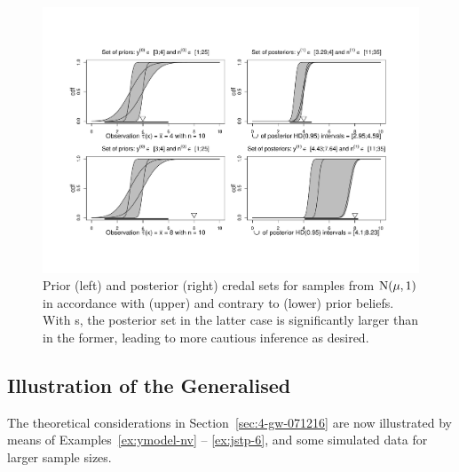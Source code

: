 \begin{figure}
\includegraphics[trim = 20mm 20mm 20mm 25mm, clip, width=\textwidth]{fig/jstp-paper_nv_nvar_vertfu01_081128}%
\caption[Generalised \ymodel\ for samples from $\norm(\mu,1)$:
prior and posterior credal sets for data in accordance with and contrary to prior beliefs.]%
{Prior (left) and posterior (right) credal sets for samples from
$\norm(\mu,1)$ in accordance with (upper) and contrary to (lower)
prior beliefs. With \nymodel s, the posterior set in the latter case is
significantly larger than in the former, leading to more cautious inference as desired.}
\label{fig:nv-nvar-vertfu}
\end{figure}


\subsection{Illustration of the Generalised \ymodel}
\label{sec:illu} 

The theoretical considerations in Section~\ref{sec:4-gw-071216} are now
illustrated by means of Examples~\ref{ex:ymodel-nv} -- \ref{ex:jstp-6},
and some simulated data for larger sample sizes.

